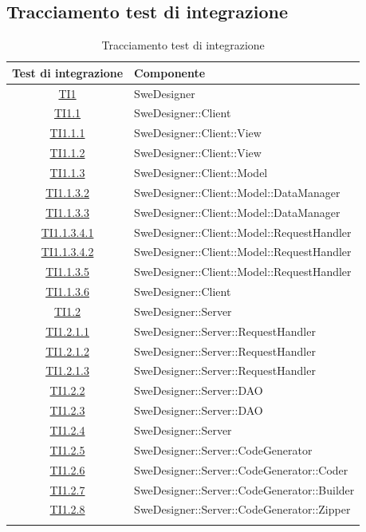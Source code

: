\documentclass[../PianoDiQualifica.tex]{subfiles}
\begin{document}
	\newpage
	\subsection{Tracciamento test di integrazione}
	\normalsize
	\begin{longtable}{|c|l|}
		\hline
		\textbf{Test di integrazione} & \textbf{Componente}\\
		\hline
		\endhead
		\hyperlink{TI1}{TI1} & SweDesigner \\
		\hline
		\hyperlink{TI1.1}{TI1.1} & SweDesigner::Client \\
		\hline
		\hyperlink{TI1.1.1}{TI1.1.1} & SweDesigner::Client::View \\
		\hline
		\hyperlink{TI1.1.2}{TI1.1.2} & SweDesigner::Client::View \\
		\hline
		\hyperlink{TI1.1.3}{TI1.1.3} & SweDesigner::Client::Model \\
		\hline
		\hyperlink{TI1.1.3.2}{TI1.1.3.2} & SweDesigner::Client::Model::DataManager \\
		\hline
		\hyperlink{TI1.1.3.3}{TI1.1.3.3} & SweDesigner::Client::Model::DataManager \\
		\hline
		\hyperlink{TI1.1.3.4.1}{TI1.1.3.4.1} & SweDesigner::Client::Model::RequestHandler \\
		\hline
		\hyperlink{TI1.1.3.4.2}{TI1.1.3.4.2} & SweDesigner::Client::Model::RequestHandler \\
		\hline
		\hyperlink{TI1.1.3.5}{TI1.1.3.5} & SweDesigner::Client::Model::RequestHandler \\
		\hline
		\hyperlink{TI1.1.3.6}{TI1.1.3.6} & SweDesigner::Client \\
		\hline
		\hyperlink{TI1.2}{TI1.2} & SweDesigner::Server \\
		\hline
		\hyperlink{TI1.2.1.1}{TI1.2.1.1} & SweDesigner::Server::RequestHandler \\
		\hline
		\hyperlink{TI1.2.1.2}{TI1.2.1.2} & SweDesigner::Server::RequestHandler \\
		\hline
		\hyperlink{TI1.2.1.3}{TI1.2.1.3} & SweDesigner::Server::RequestHandler \\
		\hline
		\hyperlink{TI1.2.2}{TI1.2.2} & SweDesigner::Server::DAO \\
		\hline
		\hyperlink{TI1.2.3}{TI1.2.3} & SweDesigner::Server::DAO \\
		\hline
		\hyperlink{TI1.2.4}{TI1.2.4} & SweDesigner::Server \\
		\hline
		\hyperlink{TI1.2.5}{TI1.2.5} & SweDesigner::Server::CodeGenerator \\
		\hline
		\hyperlink{TI1.2.6}{TI1.2.6} & SweDesigner::Server::CodeGenerator::Coder \\
		\hline
		\hyperlink{TI1.2.7}{TI1.2.7} & SweDesigner::Server::CodeGenerator::Builder \\
		\hline
		\hyperlink{TI1.2.8}{TI1.2.8} & SweDesigner::Server::CodeGenerator::Zipper \\
		\hline
		\caption[Tracciamento test di integrazione]{Tracciamento test di integrazione}
		\label{tabella:TracciamentoTestIntegrazione}
		
	\end{longtable}
\end{document}
